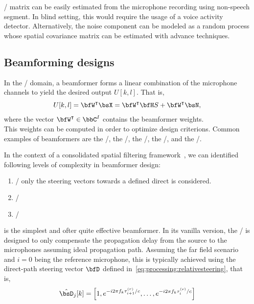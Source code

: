  \xPSD/ matrix can be easily estimated from the microphone recording using non-speech segment.
In blind setting, this would require the usage of a voice activity detector.
Alternatively, the noise component can be modeled as a random process whose spatial covariance matrix can be estimated with advance techniques.


\subsection{Beamforming designs}
In the \STFT/ domain, a beamformer forms a linear combination of the microphone channels to yield the desired output $U[k,l]$.
That is,
\begin{equation*}
    U[k,l] = \ktranspose{\bfW} \MICS = \ktranspose{\bfW} \FLTSS \SRC + \ktranspose{\bfW} \NSES,
\end{equation*}
where the vector $\ktranspose{\bfW} \in \bbC^{\numMics}$ contains the beamformer weights.
\\This weights can be computed in order to optimize design criterions.
Common examples of beamformers are the \DStxt/, the \MVDRtxt/, the \MaxSNRtxt/, the \MaxSINRtxt/, and the \LCMVtxt/.

In the context of a consolidated spatial filtering framework~, we can identified following levels of complexity in beamformer design:
\begin{enumerate}
    \item \DStxt/ only the steering vectors towards a defined direct is considered.
    \item \MVDRtxt/
    \item \LCMVtxt/
\end{enumerate}


 is the simplest and ofter quite effective beamformer.
In its vanilla version, the \DS/ is designed to only compensate the propagation delay from the source to the microphones assuming ideal propagation path.
Assuming the far field scenario and $i=0$ being the reference microphone, this is typically achieved using the direct-path steering vector $\bfD$ defined in~\cref{eq:processing:relativesteering}, that is,
\begin{equation}
    \hat{\bsD}_{j}[k] = \klist{
                         1,
                         \cste^{-\csti 2 \pi f_k \tau_{i+1}^{(r)} / \speedOfSound},
                         \ldots,
                         \cste^{-\csti 2 \pi f_k \tau_{i}^{(r)} / \speedOfSound}
                    }
\end{equation}

